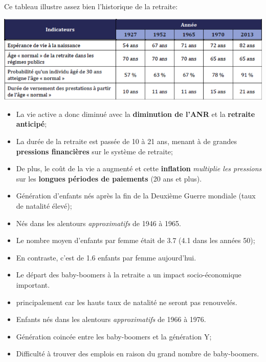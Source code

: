 \documentclass[10pt, french]{article}
\begin{document}
\begin{multicols*}{3}
\begin{rappel_enhanced}
Ce tableau illustre assez bien l'historique de la retraite:

\centerline{\includegraphics[scale=0.32]{src/ACT-1005/retraite-age-hist.png}}

\begin{itemize}[leftmargin = *]
		\item	La vie active a donc diminué avec la \textbf{diminution de l'ANR} et la \textbf{retraite anticipé};
		\item	La durée de la retraite est passée de 10 à 21 ans, menant à de grandes \textbf{pressions financières} sur le système de retraite;
		\item	De plus, le coût de la vie a augmenté et cette \textbf{inflation} \textit{multiplie les pressions} sur les \textbf{longues périodes de paiements} (20 ans et plus).
\end{itemize}
\end{rappel_enhanced}


\begin{rappel_enhanced}
\begin{itemize}[leftmargin = *]
	\item	Génération d'enfants nés après la fin de la Deuxième Guerre mondiale (taux de natalité élevé);
	\item[]	Nés dans les alentours \textit{approximatifs} de 1946 à 1965.
	\item	Le nombre moyen d'enfants par femme était de 3.7 (4.1 dans les années 50);
	\item[]	En contraste, c'est de 1.6 enfants par femme aujourd'hui.
	\item	Le départ des baby-boomers à la retraite a un impact socio-économique important.
	\item[] principalement car les hauts taux de natalité ne seront pas renouvelés.
\end{itemize}
\end{rappel_enhanced}

\begin{rappel_enhanced}
\begin{itemize}[leftmargin = *]
	\item	Enfants nés dans les alentours \textit{approximatifs} de 1966 à 1976.
	\item	Génération coincée entre les baby-boomers et la génération Y;
	\item	Difficulté à trouver des emplois en raison du grand nombre de baby-boomers.
\end{itemize}
\end{rappel_enhanced}


\end{multicols*}
\end{document}
